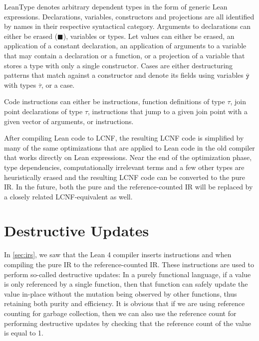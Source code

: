 LeanType denotes arbitrary dependent types in the form of generic Lean expressions. Declarations, variables, constructors and projections are all identified by names in their respective syntactical category. Arguments to declarations can either be erased ($\blacksquare$), variables or types. Let values can either be erased, an application of a constant declaration, an application of arguments to a variable that may contain a declaration or a function, or a projection of a variable that stores a type with only a single constructor. Cases are either destructuring patterns that match against a constructor  and denote its fields using variables $\overline{\texttt{y}}$ with types $\overline{\tau}$, or a  case.

Code instructions can either be  instructions, function definitions  of type $\tau$, join point declarations  of type $\tau$,  instructions that jump to a given join point with a given vector of arguments,  or  instructions.

After compiling Lean code to LCNF, the resulting LCNF code is simplified by many of the same optimizations that are applied to Lean code in the old compiler that works directly on Lean expressions. Near the end of the optimization phase, type dependencies, computationally irrelevant terms and a few other types are heuristically erased and the resulting LCNF code can be converted to the pure IR. In the future, both the pure and the reference-counted IR will be replaced by a closely related LCNF-equivalent as well. 

\section{Destructive Updates}\label{sec:beans}
In \cref{sec:irs}, we saw that the Lean 4 compiler inserts instructions  and  when compiling the pure IR to the reference-counted IR. These instructions are used to perform so-called destructive updates: In a purely functional language, if a value is only referenced by a single function, then that function can safely update the value in-place without the mutation being observed by other functions, thus retaining both purity and efficiency. It is obvious that if we are using reference counting for garbage collection, then we can also use the reference count for performing destructive updates by checking that the reference count of the value is equal to 1.

